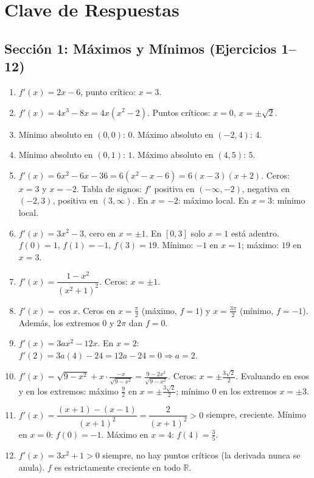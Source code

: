 \documentclass[12pt, a4paper]{article}
\begin{document}
\newpage

\section{Clave de Respuestas}

\subsection*{Sección 1: Máximos y Mínimos (Ejercicios 1--12)}

\begin{enumerate}[leftmargin=*, label=\textbf{\arabic*.}]
  \item $f'(x) = 2x - 6$, punto crítico: $x = 3$.
  \item $f'(x) = 4x^3 - 8x = 4x(x^2 - 2)$. Puntos críticos: $x = 0$, $x = \pm\sqrt{2}$.
  \item Mínimo absoluto en $(0, 0)$: $0$. Máximo absoluto en $(-2, 4)$: $4$.
  \item Mínimo absoluto en $(0, 1)$: $1$. Máximo absoluto en $(4, 5)$: $5$.
  \item $f'(x) = 6x^2 - 6x - 36 = 6(x^2 - x - 6) = 6(x - 3)(x + 2)$. Ceros: $x = 3$ y $x = -2$. Tabla de signos: $f'$ positiva en $(-\infty, -2)$, negativa en $(-2, 3)$, positiva en $(3, \infty)$. En $x = -2$: máximo local. En $x = 3$: mínimo local.
  \item $f'(x) = 3x^2 - 3$, cero en $x = \pm 1$. En $[0, 3]$ solo $x = 1$ está adentro. $f(0) = 1$, $f(1) = -1$, $f(3) = 19$. Mínimo: $-1$ en $x = 1$; máximo: $19$ en $x = 3$.
  \item $f'(x) = \dfrac{1 - x^2}{(x^2 + 1)^2}$. Ceros: $x = \pm 1$.
  \item $f'(x) = \cos x$. Ceros en $x = \frac{\pi}{2}$ (máximo, $f = 1$) y $x = \frac{3\pi}{2}$ (mínimo, $f = -1$). Además, los extremos $0$ y $2\pi$ dan $f = 0$.
  \item $f'(x) = 3ax^2 - 12x$. En $x = 2$: $f'(2) = 3a(4) - 24 = 12a - 24 = 0 \Rightarrow a = 2$.
  \item $f'(x) = \sqrt{9 - x^2} + x \cdot \frac{-x}{\sqrt{9-x^2}} = \frac{9 - 2x^2}{\sqrt{9-x^2}}$. Ceros: $x = \pm \frac{3\sqrt{2}}{2}$. Evaluando en esos y en los extremos: máximo $\frac{9}{2}$ en $x = \pm \frac{3\sqrt{2}}{2}$; mínimo $0$ en los extremos $x = \pm 3$.
  \item $f'(x) = \dfrac{(x + 1) - (x - 1)}{(x + 1)^2} = \dfrac{2}{(x + 1)^2} > 0$ siempre, creciente. Mínimo en $x = 0$: $f(0) = -1$. Máximo en $x = 4$: $f(4) = \frac{3}{5}$.
  \item $f'(x) = 3x^2 + 1 > 0$ siempre, no hay puntos críticos (la derivada nunca se anula). $f$ es estrictamente creciente en todo $\mathbb{R}$.
\end{enumerate}
\end{document}
